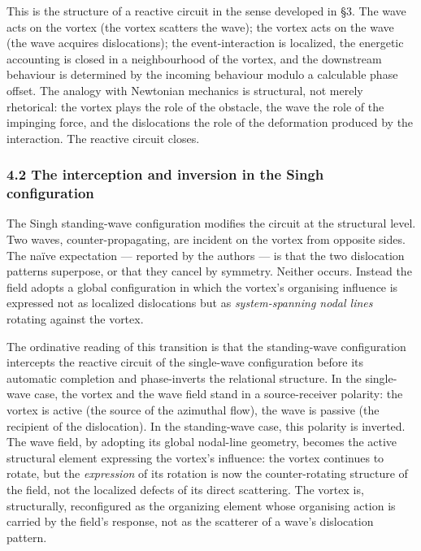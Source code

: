 \documentclass[
  11pt,
  a4paper,
]{article}
\begin{document}
This is the structure of a reactive circuit in the sense developed in
§3. The wave acts on the vortex (the vortex scatters the wave); the
vortex acts on the wave (the wave acquires dislocations); the
event-interaction is localized, the energetic accounting is closed in a
neighbourhood of the vortex, and the downstream behaviour is determined
by the incoming behaviour modulo a calculable phase offset. The analogy
with Newtonian mechanics is structural, not merely rhetorical: the
vortex plays the role of the obstacle, the wave the role of the
impinging force, and the dislocations the role of the deformation
produced by the interaction. The reactive circuit closes.

\subsubsection{4.2 The interception and inversion in the Singh
configuration}\label{the-interception-and-inversion-in-the-singh-configuration}

The Singh standing-wave configuration modifies the circuit at the
structural level. Two waves, counter-propagating, are incident on the
vortex from opposite sides. The naïve expectation --- reported by the
authors --- is that the two dislocation patterns superpose, or that they
cancel by symmetry. Neither occurs. Instead the field adopts a global
configuration in which the vortex's organising influence is expressed
not as localized dislocations but as \emph{system-spanning nodal lines}
rotating against the vortex.

The ordinative reading of this transition is that the standing-wave
configuration intercepts the reactive circuit of the single-wave
configuration before its automatic completion and phase-inverts the
relational structure. In the single-wave case, the vortex and the wave
field stand in a source-receiver polarity: the vortex is active (the
source of the azimuthal flow), the wave is passive (the recipient of the
dislocation). In the standing-wave case, this polarity is inverted. The
wave field, by adopting its global nodal-line geometry, becomes the
active structural element expressing the vortex's influence: the vortex
continues to rotate, but the \emph{expression} of its rotation is now
the counter-rotating structure of the field, not the localized defects
of its direct scattering. The vortex is, structurally, reconfigured as
the organizing element whose organising action is carried by the field's
response, not as the scatterer of a wave's dislocation pattern.
\end{document}
